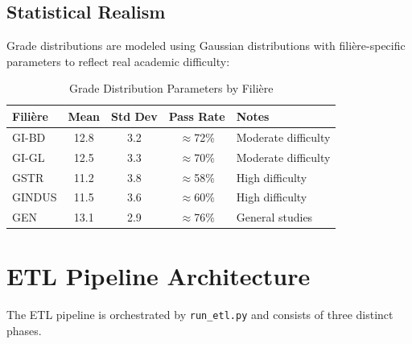 \documentclass[12pt, a4paper]{report}
\begin{document}
\subsection{Statistical Realism}

Grade distributions are modeled using Gaussian distributions with filière-specific parameters to reflect real academic difficulty:

\begin{table}[H]
\centering
\caption{Grade Distribution Parameters by Filière}
\label{tab:grade_dist}
\begin{tabular}{@{}lcccp{4cm}@{}}
\toprule
\textbf{Filière} & \textbf{Mean} & \textbf{Std Dev} & \textbf{Pass Rate} & \textbf{Notes} \\
\midrule
GI-BD   & 12.8 & 3.2 & $\approx$72\% & Moderate difficulty \\
GI-GL   & 12.5 & 3.3 & $\approx$70\% & Moderate difficulty \\
GSTR    & 11.2 & 3.8 & $\approx$58\% & High difficulty \\
GINDUS  & 11.5 & 3.6 & $\approx$60\% & High difficulty \\
GEN     & 13.1 & 2.9 & $\approx$76\% & General studies \\
\bottomrule
\end{tabular}
\end{table}

\section{ETL Pipeline Architecture}

The ETL pipeline is orchestrated by \texttt{run\_etl.py} and consists of three distinct phases.
\end{document}
